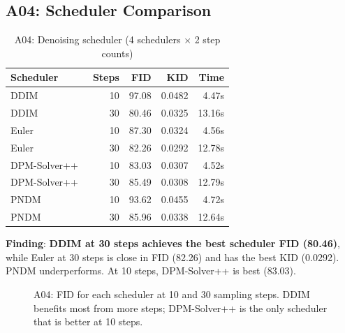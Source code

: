 \documentclass[11pt]{article}
\begin{document}
\subsection{A04: Scheduler Comparison}

\begin{table}[!htbp]
\centering
\caption{A04: Denoising scheduler (4 schedulers $\times$ 2 step counts)}
\begin{tabular}{lrrrr}
\toprule
Scheduler & Steps & FID & KID & Time \\
\midrule
DDIM~\cite{song2021denoising} & 10 & 97.08 & 0.0482 & 4.47s \\
DDIM & 30 & 80.46 & 0.0325 & 13.16s \\
Euler~\cite{karras2022elucidating} & 10 & 87.30 & 0.0324 & 4.56s \\
Euler & 30 & 82.26 & 0.0292 & 12.78s \\
DPM-Solver++~\cite{lu2022dpmsolverpp} & 10 & 83.03 & 0.0307 & 4.52s \\
DPM-Solver++ & 30 & 85.49 & 0.0308 & 12.79s \\
PNDM~\cite{liu2022pseudo} & 10 & 93.62 & 0.0455 & 4.72s \\
PNDM & 30 & 85.96 & 0.0338 & 12.64s \\
\bottomrule
\end{tabular}
\end{table}

\textbf{Finding}: \textbf{DDIM at 30 steps achieves the best scheduler FID (80.46)}, while Euler at 30 steps is close in FID (82.26) and has the best KID (0.0292). PNDM underperforms. At 10 steps, DPM-Solver++ is best (83.03).

\begin{figure}[!htbp]
\centering
{}
\caption{A04: FID for each scheduler at 10 and 30 sampling steps. DDIM benefits most from more steps; DPM-Solver++ is the only scheduler that is better at 10 steps.}
\label{fig:a04}
\end{figure}
\end{document}
